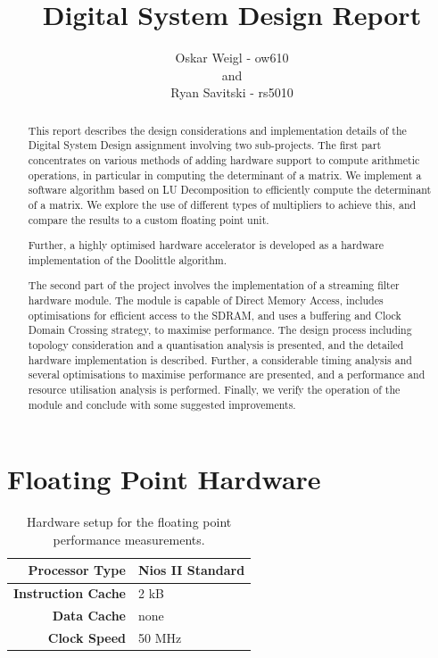 \documentclass[]{article}
\title{Digital System Design Report}
\author{Oskar Weigl - ow610\\ and \\ Ryan Savitski - rs5010}
\begin{document}
\maketitle

\renewcommand{\abstractname}{Introduction}
\begin{abstract}

	This report describes the design considerations and implementation details of the Digital System Design assignment involving two sub-projects.
	The first part concentrates on various methods of adding hardware support to compute arithmetic operations, in particular in computing the determinant of a matrix.
	We implement a software algorithm based on LU Decomposition to efficiently compute the determinant of a matrix. We explore the use of different types of multipliers to achieve this, and compare the results to a custom floating point unit.

	Further, a highly optimised hardware accelerator is developed as a hardware implementation of the Doolittle algorithm.

	The second part of the project involves the implementation of a streaming filter hardware module.
	The module is capable of Direct Memory Access, includes optimisations for efficient access to the SDRAM, and uses a buffering and Clock Domain Crossing strategy, to maximise performance.
	The design process including topology consideration and a quantisation analysis is presented, and the detailed hardware implementation is described.
	Further, a considerable timing analysis and several optimisations to maximise performance are presented, and a performance and resource utilisation analysis is performed. 
	Finally, we verify the operation of the module and conclude with some suggested improvements.

\end{abstract}
\clearpage


\tableofcontents
\clearpage


\section{Floating Point Hardware} %
\label{sec:floating_point_hardware}


\begin{table}[bp]
	\caption{Hardware setup for the floating point performance measurements.}
	\label{tab:fp_hw_setup}
	\begin{center}
		\begin{tabular}{r|l}
		\hline

		\hline
			\textbf{Processor Type} 	& Nios II Standard \\
		\hline
			\textbf{Instruction Cache}	& 2 kB \\
		\hline
			\textbf{Data Cache}			& none \\
		\hline
			\textbf{Clock Speed}		& 50 MHz \\
		\hline

		\hline
		\end{tabular}
	\end{center}
\end{table}
\end{document}
